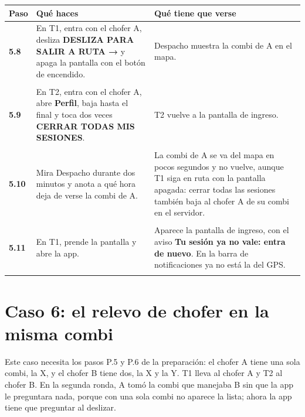 \documentclass[10pt,a4paper]{article}
\makeatletter
\newcommand{\toca}[1]{\textcolor{azul}{\textbf{#1}}}
\newcommand{\pantalla}[1]{\textcolor{marron}{\textbf{#1}}}
\newcommand{\caja}[2]{\hbox{\vrule height #1 depth 0pt width 0pt #2}}
\newcommand{\campo}[3]{%
  \raisebox{-0.35\height}{\caja{#3}{\TextField[name=#1, width=#2, height=#3, charsize=8pt, bordercolor={0.55 0.6 0.68},
    backgroundcolor={0.965 0.976 0.992}, multiline=true]{}}}}
\newcommand{\resultado}[1]{%
  \caja{9pt}{\ChoiceMenu[radio, name=resultado-#1, width=9pt, height=9pt, radiosymbol=l,
    bordercolor={0.35 0.38 0.45}, default=]{}{OK=ok,FALLA=falla,NO SE PUDO=nopudo}}}
\newcommand{\paso}[4]{%
  \textbf{#1} & #3 & #4 \\*
  \multicolumn{3}{@{\hspace{6pt}}l@{}}{\rule{0pt}{15pt}\small
    \resultado{#2}\hspace{0.4em}Hora:~\campo{hora-#2}{1.7cm}{13pt}\hspace{1.2em}Nota:~\campo{nota-#2}{8.3cm}{22pt}}\\[3pt]
  \hline
}
\newenvironment{pasos}{%
  \begin{longtable}{@{\hspace{6pt}}>{\raggedright\arraybackslash}p{0.9cm}>{\raggedright\arraybackslash}p{7.9cm}>{\raggedright\arraybackslash}p{7.3cm}@{}}
  \rowcolor{cabecera}\textbf{Paso} & \textbf{Qué haces} & \textbf{Qué tiene que verse} \\ \hline
  \endhead
}{\end{longtable}\vspace{-0.6em}}
\makeatother
\begin{document}
\begin{Form}
\begin{pasos}
\paso{5.8}{5-8}{En T1, entra con el chofer A, desliza \toca{DESLIZA PARA SALIR A RUTA →} y apaga la pantalla con el botón de encendido.}{Despacho muestra la combi de A en el mapa.}
\paso{5.9}{5-9}{En T2, entra con el chofer A, abre \toca{Perfil}, baja hasta el final y toca dos veces \toca{CERRAR TODAS MIS SESIONES}.}{T2 vuelve a la pantalla de ingreso.}
\paso{5.10}{5-10}{Mira Despacho durante dos minutos y anota a qué hora deja de verse la combi de A.}{La combi de A se va del mapa en pocos segundos y no vuelve, aunque T1 siga en ruta con la pantalla apagada: cerrar todas las sesiones también baja al chofer A de su combi en el servidor.}
\paso{5.11}{5-11}{En T1, prende la pantalla y abre la app.}{Aparece la pantalla de ingreso, con el aviso \pantalla{Tu sesión ya no vale: entra de nuevo}. En la barra de notificaciones ya no está la del GPS.}
\end{pasos}

\section{Caso 6: el relevo de chofer en la misma combi}

Este caso necesita los pasos P.5 y P.6 de la preparación: el chofer A tiene una sola combi, la X, y el chofer B tiene dos, la X y la Y. T1 lleva al chofer A y T2 al chofer B. En la segunda ronda, A tomó la combi que manejaba B sin que la app le preguntara nada, porque con una sola combi no aparece la lista; ahora la app tiene que preguntar al deslizar.


\end{Form}
\end{document}
